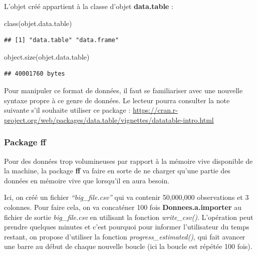 \documentclass[
]{book}
\newenvironment{Shaded}{\begin{snugshade}}{\end{snugshade}}
\newcommand{\FunctionTok}[1]{\textcolor[rgb]{0.00,0.00,0.00}{#1}}
\newcommand{\NormalTok}[1]{#1}
\theoremstyle{definition}
\theoremstyle{definition}
\theoremstyle{definition}
\theoremstyle{definition}
\theoremstyle{remark}
\begin{document}
L'objet créé appartient à la classe d'objet \textbf{data.table} :

\begin{Shaded}
\begin{Highlighting}[]
\FunctionTok{class}\NormalTok{(objet.data.table)}
\end{Highlighting}
\end{Shaded}

\begin{verbatim}
## [1] "data.table" "data.frame"
\end{verbatim}

\begin{Shaded}
\begin{Highlighting}[]
\FunctionTok{object.size}\NormalTok{(objet.data.table)}
\end{Highlighting}
\end{Shaded}

\begin{verbatim}
## 40001760 bytes
\end{verbatim}

Pour manipuler ce format de données, il faut se familiariser avec une nouvelle syntaxe propre à ce genre de données. Le lecteur pourra consulter la note suivante s'il souhaite utiliser ce package : \url{https://cran.r-project.org/web/packages/data.table/vignettes/datatable-intro.html}

\hypertarget{package-ff}{%
\subsubsection{\texorpdfstring{Package \textbf{ff}}{Package ff}}\label{package-ff}}

Pour des données trop volumineuses par rapport à la mémoire vive disponible de la machine, la package \textbf{ff} va faire en sorte de ne charger qu'une partie des données en mémoire vive que lorsqu'il en aura besoin.

Ici, on créé un fichier \emph{``big\_file.csv''} qui va contenir 50,000,000 observations et 3 colonnes. Pour faire cela, on va concaténer 100 fois \textbf{Donnees.a.importer} au fichier de sortie \emph{big\_file.csv} en utilisant la fonction \emph{write\_csv()}. L'opération peut prendre quelques minutes et c'est pourquoi pour informer l'utilisateur du temps restant, on propose d'utiliser la fonction \emph{progress\_estimated()}, qui fait avancer une barre au début de chaque nouvelle boucle (ici la boucle est répétée 100 fois).
\end{document}
